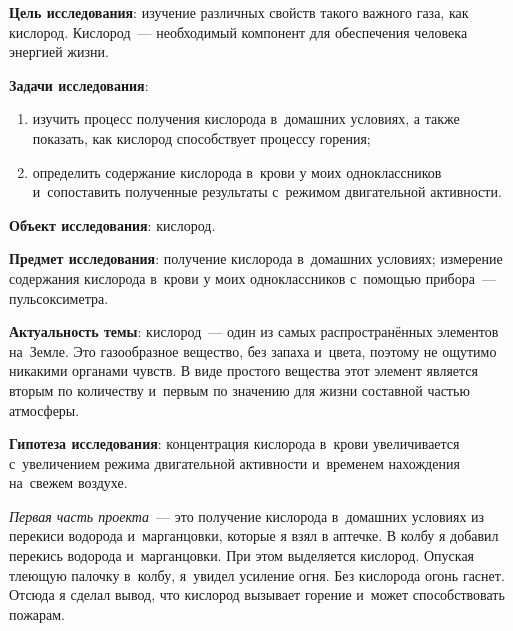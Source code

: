 \bigskip
{}



\makeProcTitleSchool


\textbf{Цель исследования}: изучение различных свойств такого важного газа, как кислород. Кислород~--- необходимый компонент для обеспечения человека энергией жизни.

\textbf{Задачи исследования}:
\begin{enumerate}[noitemsep]\vspace{-8pt}
\item изучить процесс получения кислорода в~домашних условиях, а также показать, как кислород способствует процессу горения;
\item определить содержание кислорода в~крови у моих одноклассников и~сопоставить полученные результаты с~режимом двигательной активности.
\end{enumerate}\vspace{-8pt}

\textbf{Объект исследования}: кислород.

\textbf{Предмет исследования}: получение кислорода в~домашних условиях; измерение содержания кислорода в~крови у моих одноклассников с~помощью прибора~--- пульсоксиметра.

\textbf{Актуальность темы}: кислород~--- один из самых распространённых элементов на~Земле. Это газообразное вещество, без запаха и~цвета, поэтому не ощутимо никакими органами чувств. В виде простого вещества этот элемент является вторым по количеству и~первым по значению для жизни составной частью атмосферы.

\textbf{Гипотеза исследования}: концентрация кислорода в~крови увеличивается с~увеличением режима двигательной активности и~временем нахождения на~свежем воздухе.

\textit{Первая часть проекта}~--- это получение кислорода в~домашних условиях из перекиси водорода и~марганцовки, которые я взял в аптечке. В колбу я добавил перекись водорода и~марганцовки. При этом выделяется кислород. Опуская тлеющую палочку в~колбу, я~увидел усиление огня. Без кислорода огонь гаснет. Отсюда я сделал вывод, что кислород вызывает горение и~может способствовать пожарам.

